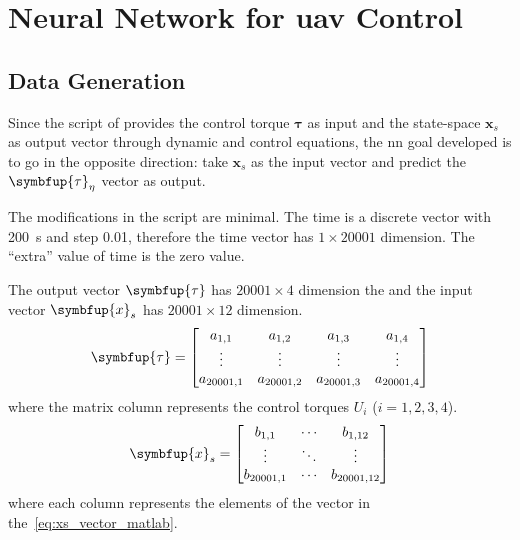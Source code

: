 \section{Neural Network for \gls*{uav} Control}

\subsection{Data Generation}

Since the script of \citet{geronel2023} provides the control torque \(\symbf{\tau}\) as input and the state-space \(\symbf{x}_s\) as output vector through dynamic and control equations, the \gls*{nn} goal developed is to go in the opposite direction: take \(\symbf{x}_s\) as the input vector and predict the \(\symbfup{\tau}_{\eta}\) vector as output.

The modifications in the script are minimal.
The time is a discrete vector with \SI{200}{s} and step 0.01, therefore the time vector has \(1\times 20001\) dimension.
The ``extra'' value of time is the zero value.

The output vector \(\symbfup{\tau}\) has \(20001\times 4\) dimension the and the input vector \(\symbfup{x}_s\) has  \(20001\times 12\) dimension.
%
\begin{equation}\label{eq:tau_input}
    \symbfup{\tau} = \begin{bmatrix}
        a_{1,1}      & a_{1,2}      & a_{1,3}      & a_{1,4} \\
        \vdots       & \vdots       & \vdots       & \vdots  \\
        a_{20001, 1} & a_{20001, 2} & a_{20001, 3} & a_{20001, 4} 
    \end{bmatrix}
\end{equation}
%
where the matrix column represents the control torques \(U_i\) (\(i=1,2,3,4\)).
%
\begin{equation}\label{eq:xs_output}
    \symbfup{x}_s = \begin{bmatrix}
        b_{1,1}      & \cdots & b_{1,12} \\
        \vdots       & \ddots & \vdots \\
        b_{20001, 1} & \cdots & b_{20001, 12} 
    \end{bmatrix}
\end{equation}
%
where each column represents the elements of the vector in the~\cref{eq:xs_vector_matlab}.

